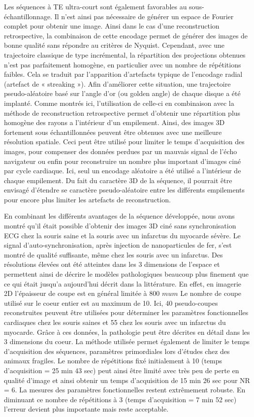 Les séquences à TE ultra-court sont également favorables au sous-échantillonnage. Il n’est ainsi pas nécessaire de générer un espace de Fourier complet pour obtenir une image. Ainsi dans le cas d'une reconstruction retrospective, la combinaison de cette encodage permet de générer des images de bonne qualité sans répondre au critères de Nyquist. Cependant, avec une trajectoire classique de type incrémental, la répartition des projections obtenues n’est pas parfaitement homogène, en particulier avec un nombre de répétitions faibles. Cela se traduit par l’apparition d'artefacts typique de l'encodage radial (artefact de « streaking »).
Afin d’améliorer cette situation, une trajectoire pseudo-aléatoire basé sur l’angle d’or (ou golden angle) de chaque disque a été implanté. Comme montrés ici, l’utilisation de celle-ci en combinaison avec la méthode de reconstruction retrospective permet d’obtenir une répartition plus homogène des rayons a l’intérieur d’un empilement. Ainsi, des images 3D fortement sous échantillonnées peuvent être obtenues avec une meilleure résolution spatiale. Ceci peut être utilisé pour limiter le temps d’acquisition des images, pour compenser des données perdues par un mauvais signal de l’écho navigateur ou enfin pour reconstruire un nombre plus important d’images ciné par cycle cardiaque. Ici, seul un encodage aléatoire a été utilisé a l’intérieur de chaque empilement. Du fait du caractère 3D de la séquence, il pourrait être envisagé d’étendre se caractère pseudo-aléatoire entre les différents empilements pour encore plus limiter les artefacts de reconstruction.

En combinant les différents avantages de la séquence développée, nous avons montré qu’il était possible d’obtenir des images 3D ciné sans synchronisation ECG chez la souris saine et la souris avec un infarctus du myocarde sévère. Le signal d’auto-synchronisation, après injection de nanoparticules de fer, s’est montré de qualité suffisante, même chez les souris avec un infarctus. Des résolutions élevées ont été atteintes dans les 3 dimensions de l’espace et permettent ainsi de décrire le modèles pathologiques beaucoup plus finement que ce qui était jusqu’a aujourd’hui décrit dans la littérature. En effet, en imagerie 2D l’épaisseur de coupe est en général limitée à 800 $mu m$ \cite{Bovens:2011aa,Hoerr:2013gf} Le nombre de coupe utilisé sur le coeur entier est au maximum de 10. Ici, 40 pseudo-coupes reconstruites peuvent être utilisées pour déterminer les paramètres fonctionnelles cardiaques chez les souris saines et 55 chez les souris avec un infarctus du myocarde. Grâce à ces données, la pathologie peut être décrites en détail dans les 3 dimensions du coeur. La méthode utilisée permet également de limiter le temps d’acquisition des séquences, paramètres primordiales lors d’études chez des animaux fragiles. Le nombre de répétitions fixé initialement à 10 (temps d’acquisition = 25 min 43 sec) peut ainsi être limité avec très peu de perte en qualité d’image et ainsi obtenir un temps d’acquisition de 15 min 26 sec pour NR = 6. La mesures des paramètres fonctionnelles restent extrêmement robuste. En diminuant ce nombre de répétitions à 3 (temps d’acquisition = 7 min 52 sec) l’erreur devient plus importante mais reste acceptable. 

